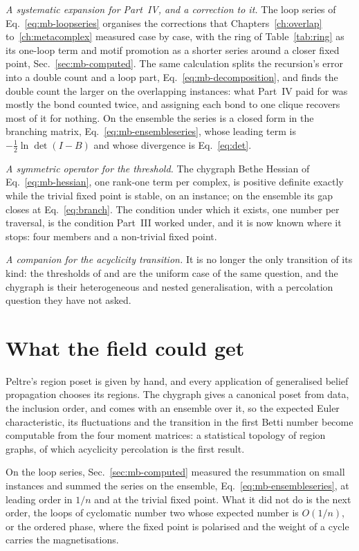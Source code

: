 \emph{A systematic expansion for Part~IV, and a correction to it.} The
loop series of Eq.~\eqref{eq:mb-loopseries} organises the corrections
that Chapters~\ref{ch:overlap} to~\ref{ch:metacomplex} measured case by
case, with the ring of Table~\ref{tab:ring} as its one-loop term and
motif promotion as a shorter series around a closer fixed point,
Sec.~\ref{sec:mb-computed}. The same calculation splits the recursion's
error into a double count and a loop part, Eq.~\eqref{eq:mb-decomposition},
and finds the double count the larger on the overlapping instances: what
Part~IV paid for was mostly the bond counted twice, and assigning each
bond to one clique recovers most of it for nothing. On the ensemble the
series is a closed form in the branching matrix,
Eq.~\eqref{eq:mb-ensembleseries}, whose leading term is
$-\tfrac12\ln\det(I-B)$ and whose divergence is Eq.~\eqref{eq:det}.

\emph{A symmetric operator for the threshold.} The chygraph Bethe Hessian
of Eq.~\eqref{eq:mb-hessian}, one rank-one term per complex, is positive
definite exactly while the trivial fixed point is stable, on an instance;
on the ensemble its gap closes at Eq.~\eqref{eq:branch}. The condition
under which it exists, one number per traversal, is the condition
Part~III worked under, and it is now known where it stops: four members
and a non-trivial fixed point.

\emph{A companion for the acyclicity transition.} It is no longer the only
transition of its kind: the thresholds of \citet{linial2006} and
\citet{aronshtam2013} are the uniform case of the same question, and the
chygraph is their heterogeneous and nested generalisation, with a
percolation question they have not asked.

\section{What the field could get}
\label{sec:mb-field}

Peltre's region poset is given by hand, and every application of
generalised belief propagation chooses its regions. The chygraph gives a
canonical poset from data, the inclusion order, and comes with an ensemble
over it, so the expected Euler characteristic, its fluctuations and the
transition in the first Betti number become computable from the four moment
matrices: a statistical topology of region graphs, of which acyclicity
percolation is the first result.

On the loop series, Sec.~\ref{sec:mb-computed} measured the resummation
on small instances and summed the series on the ensemble,
Eq.~\eqref{eq:mb-ensembleseries}, at leading order in $1/n$ and at the
trivial fixed point. What it did not do is the next order, the loops of
cyclomatic number two whose expected number is $O(1/n)$, or the ordered
phase, where the fixed point is polarised and the weight of a cycle
carries the magnetisations.

